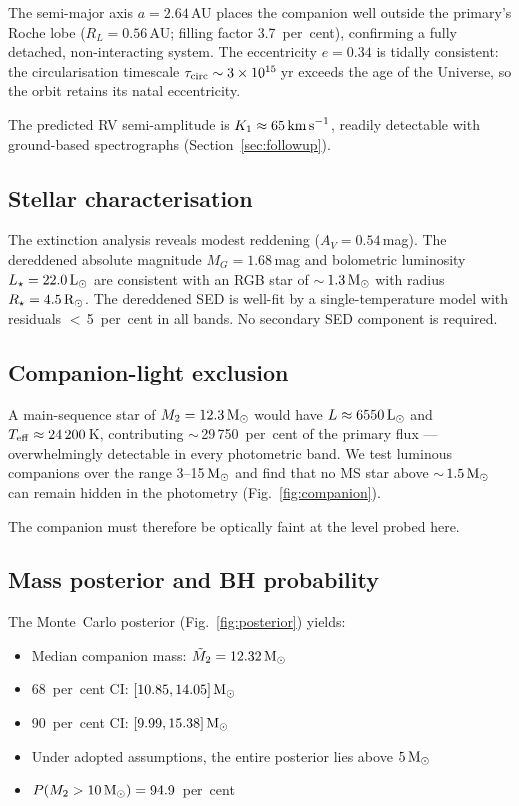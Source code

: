 \documentclass[usenatbib,fleqn]{mnras}
\newcommand{\Msun}{{\rm M}_\odot}
\newcommand{\Lsun}{{\rm L}_\odot}
\newcommand{\Rsun}{{\rm R}_\odot}
\newcommand{\kms}{{\rm km\,s}^{-1}}
\begin{document}
The semi-major axis $a = 2.64$\,AU places the companion well
outside the primary's Roche lobe ($R_L = 0.56$\,AU; filling
factor 3.7~per~cent), confirming a fully detached,
non-interacting system.  The eccentricity $e = 0.34$ is
tidally consistent: the circularisation timescale
$\tau_{\rm circ} \sim 3 \times 10^{15}$\,yr exceeds the age of
the Universe, so the orbit retains its natal eccentricity.

The predicted RV semi-amplitude is $K_1 \approx 65\,\kms$,
readily detectable with ground-based spectrographs
(Section~\ref{sec:followup}).

\subsection{Stellar characterisation}
\label{sec:results:stellar}

The extinction analysis reveals modest reddening
($A_V = 0.54$\,mag).  The dereddened absolute magnitude
$M_G = 1.68$\,mag and bolometric luminosity
$L_\star = 22.0\,\Lsun$ are consistent with an RGB star of
$\sim$\,$1.3\,\Msun$ with radius $R_\star = 4.5\,\Rsun$.  The
dereddened SED is well-fit by a single-temperature model with
residuals $<$\,5~per~cent in all bands.  No secondary SED
component is required.

\subsection{Companion-light exclusion}
\label{sec:results:companion}

A main-sequence star of $M_2 = 12.3\,\Msun$ would have
$L \approx 6550\,\Lsun$ and $T_{\rm eff} \approx 24\,200$\,K,
contributing $\sim$\,29\,750~per~cent of the primary flux ---
overwhelmingly detectable in every photometric band.  We test
luminous companions over the range 3--15\,$\Msun$ and find that no
MS star above $\sim$\,$1.5\,\Msun$ can remain hidden in the
photometry (Fig.~\ref{fig:companion}).

The companion must therefore be optically faint at the level
probed here.

\subsection{Mass posterior and BH probability}
\label{sec:results:posterior}

The Monte~Carlo posterior (Fig.~\ref{fig:posterior}) yields:
\begin{itemize}
\item Median companion mass: $\tilde{M}_2 = 12.32\,\Msun$
\item 68~per~cent CI: $[10.85, 14.05]\,\Msun$
\item 90~per~cent CI: $[9.99, 15.38]\,\Msun$
\item Under adopted assumptions, the entire posterior lies above
  $5\,\Msun$
\item $P(M_2 > 10\,\Msun) = 94.9$~per~cent
\end{itemize}
\end{document}

